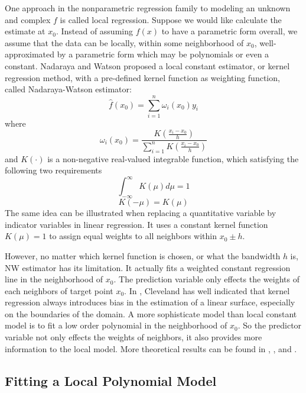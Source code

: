 One approach in the nonparametric regression family to modeling an unknown and
complex $f$ is called local regression. Suppose we would like calculate the 
estimate at $x_0$. Instead of assuming 
$f(x)$ to have a parametric form overall, we assume that the data can be locally, 
within some neighborhood of $x_0$, well-approximated by a parametric form which 
may be polynomials or even a constant.
Nadaraya \cite{nadaraya1964} and Watson \cite{watson1964} proposed a local 
constant estimator, or kernel regression method, with a pre-defined kernel 
function as weighting function, called Nadaraya-Watson estimator:
\begin{equation} 
\hat f(x_0) = \sum_{i=1}^{n} \omega_{i}(x_0)y_i
\end{equation} 
where 
\begin{equation} 
\omega_i(x_0) = \frac{ K(\frac{x_i - x_0}{h})}{\sum_{i=1}^n K(\frac{x_i - x_0}{h})}
\end{equation} 
and $K(\cdot)$ is a non-negative real-valued integrable function, which satisfying 
the following two requirements
\begin{equation} 
\int_{-\infty}^{\infty} K(\mu)d\mu = 1
\end{equation} 
\begin{equation} 
K(-\mu) = K(\mu)
\end{equation}
The same idea can be illustrated when replacing a quantitative variable by
indicator variables in linear regression. It uses a constant kernel function 
$K(\mu) = 1$ to assign equal weights to all neighbors within $x_0 \pm h$. 

However, no matter which kernel function is chosen, or what the bandwidth $h$ is,
NW estimator has its limitation. It actually fits a weighted constant regression
line in the neighborhood of $x_0$. The prediction variable only effects the weights
of each neighbors of target point $x_0$. In \cite{cleveland1988regression}, 
Cleveland has well indicated that kernel regression always introduces bias in the
estimation of a linear surface, especially on the boundaries of the domain. A more 
sophisticate model than local constant model is to fit a low order polynomial in 
the neighborhood of $x_0$. So the 
predictor variable not only effects the weights of neighbors, it also provides more
information to the local model. More theoretical results can be found in 
\cite{fan1992design}, \cite{fan1993local}, and \cite{hastie1993varying}.

\subsection{Fitting a Local Polynomial Model}
\label{sec:loess}

